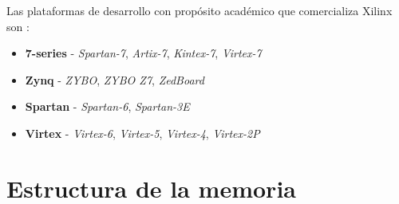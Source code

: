 Las plataformas de desarrollo con propósito académico que comercializa Xilinx son \cite{students}:

\begin{itemize}
    \item \textbf{7-series} - \textit{Spartan-7}, \textit{Artix-7}, \textit{Kintex-7}, \textit{Virtex-7}
    \item \textbf{Zynq} - \textit{ZYBO}, \textit{ZYBO Z7}, \textit{ZedBoard}
    \item \textbf{Spartan} - \textit{Spartan-6}, \textit{Spartan-3E}
    \item \textbf{Virtex} - \textit{Virtex-6}, \textit{Virtex-5}, \textit{Virtex-4}, \textit{Virtex-2P}
\end{itemize}


\section{Estructura de la memoria} 
 
 
 